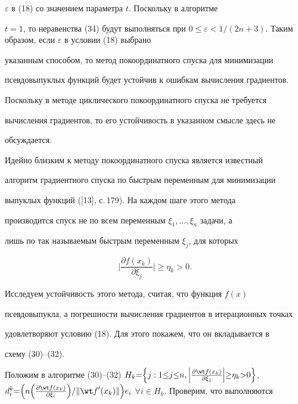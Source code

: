 $\varepsilon $ в (18) со значением параметра $t$. Поскольку в алгоритме


$t=1$, то неравенства (34) будут выполняться при $0\le\varepsilon


<1/(2n+3)$. Таким образом, если $\varepsilon$ в условии (18) выбрано


указанным способом, то метод покоординатного спуска для минимизации


псевдовыпуклых функций будет устойчив к ошибкам вычисления градиентов.


Поскольку в методе циклического покоординатного спуска не требуется


вычисления градиентов, то его устойчивость в указанном смысле здесь не


обсуждается.





Идейно близким к методу покоординатного спуска является известный


алгоритм градиентного спуска по быстрым переменным для минимизации


выпуклых функций ([13], с.\,179). На каждом шаге этого метода


производится спуск не по всем переменным $\xi_1,\dotsc,\xi_n$ задачи, а


лишь по так называемым быстрым переменным $\xi_j$, для которых


$$ 


\bigg|{\frac{\partial f(x_k)}{\partial\xi_j}}\bigg|\ge\eta_k>0.


$$


Исследуем устойчивость этого метода, считая, что функция $f(x)$


псевдовыпукла, а погрешности вычисления градиентов в итерационных точках


удовлетворяют условию (18). Для этого покажем, что он вкладывается в


схему (30)--(32).





Положим в алгоритме (30)--(32) $H_k{=}\Big\{{j:1{\le} j{\le} n,


\Big|{\frac{\partial\wt f(x_k)}{\partial\xi_j}}\Big|{\ge}


\eta_k{>}0}\Big\}$, $d_i^k{=}\Big({n\Big({\frac{\partial


\wt f(x_k)}{\partial\xi_i}}\Big)/\|{{\wt f}'(x_k)}


\|}\Big) e_i$ $\forall i\in H_k$. Проверим, что выполняются


